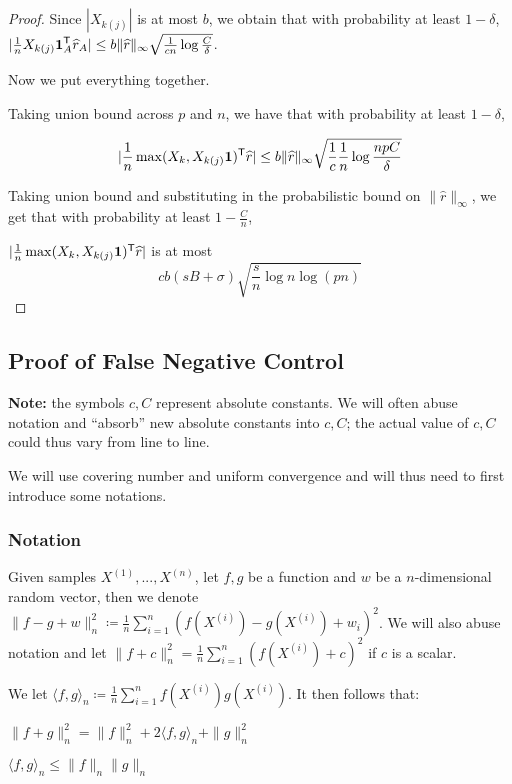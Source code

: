 \begin{proof}
Since $|X_{k(j)}|$ is at most $b$, we obtain that with probability at least $1-\delta$, $| \frac{1}{n} X_{k(j)} \mbox{\boldmath $1$}_A^{\mathsf{T}} \widehat{r}_A| \leq b\| \widehat{r} \|_\infty \sqrt{ \frac{1}{cn} \log \frac{C}{\delta}}$.

Now we put everything together.

Taking union bound across $p$ and $n$, we have that with probability at least $1-\delta$, 

\[
| \frac{1}{n} \max(X_k, X_{k(j)}\mbox{\boldmath $1$})^{\mathsf{T}} \widehat{r}| \leq b \|\widehat{r}\|_\infty \sqrt{ \frac{1}{c} \frac{1}{n} \log \frac{np C }{\delta}}
\]

Taking union bound and substituting in the probabilistic bound on $\|\hat{r}\|_\infty$, we get that with probability at least $1-\frac{C}{n}$,

$| \frac{1}{n} \max(X_k, X_{k(j)}\mbox{\boldmath $1$})^{\mathsf{T}} \widehat{r}|$ is at most 
\[
 c b (sB + \sigma) \sqrt{ \frac{s}{n} \log n \log (pn) }
\]

\end{proof}

 
 
 
 
 
 \subsection{Proof of False Negative Control}
 \label{sec:false_negative_proof}
 
\textbf{Note:} the symbols $c,C$ represent absolute constants. We will often abuse notation and ``absorb'' new absolute constants into $c, C$; the actual value of $c, C$ could thus vary from line to line.

 We will use covering number and uniform convergence and will thus need to first introduce some notations. 
 \subsubsection{Notation} 

 Given samples $X^{(1)},...,X^{(n)}$, let $f, g$ be a function and $w$ be a $n$-dimensional random vector, then we denote $\| f - g + w\|_n^2 \coloneqq \frac{1}{n} \sum_{i=1}^n ( f(X^{(i)}) - g(X^{(i)}) + w_i )^2$. We will also abuse notation and let $\| f + c \|_n^2 = \frac{1}{n} \sum_{i=1}^n (f(X^{(i)}) + c)^2$ if $c$ is a scalar.

We let $\langle f, g \rangle_n \coloneqq \frac{1}{n} \sum_{i=1}^n f(X^{(i)}) g(X^{(i)})$. It then follows that:
\begin{packed_enum}
\item $\| f + g \|_n^2 = \|f\|_n^2 + 2 \langle f, g \rangle_n + \|g \|_n^2$
\item $\langle f, g \rangle_n \leq \|f\|_n \| g \|_n$
\end{packed_enum}

